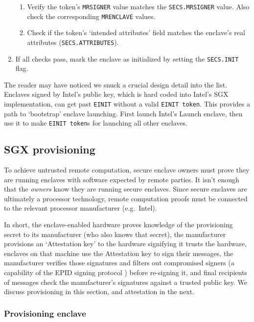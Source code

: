 \begin{enumerate}
\begin{enumerate}
        \item Verify the token's {\tt MRSIGNER} value matches the {\tt SECS.MRSIGNER} value. Also check the corresponding {\tt MRENCLAVE} values.

        \item Check if the token's `intended attributes' field matches the enclave's real attributes ({\tt SECS.ATTRIBUTES}).
    \end{enumerate}

    \item If all checks pass, mark the enclave as initialized by setting the {\tt SECS.INIT} flag.
\end{enumerate}

The reader may have noticed we snuck a crucial design detail into the list. Enclaves signed by Intel's public key, which is hard coded into Intel's SGX implementation, can get past {\tt EINIT} without a valid {\tt EINIT token}. This provides a path to `bootstrap' enclave launching. First launch Intel's Launch enclave, then use it to make {\tt EINIT token}s for launching all other enclaves.


\subsection{SGX provisioning}
\label{subsec:enclaves-sgx-provisioning}

To achieve untrusted remote computation, secure enclave owners must prove they are running enclaves with software expected by remote parties. It isn't enough that the {\em owners} know they are running secure enclaves. Since secure enclaves are ultimately a processor technology, remote computation proofs must be connected to the relevant processor manufacturer (e.g.\ Intel).

In short, the enclave-enabled hardware proves knowledge of the provisioning secret to its manufacturer (who also knows that secret), the manufacturer provisions an `Attestation key' to the hardware signifying it trusts the hardware, enclaves on that machine use the Attestation key to sign their messages, the manufacturer verifies those signatures and filters out compromised signers (a capability of the EPID signing protocol \cite{epid-paper}) before re-signing it, and final recipients of messages check the manufacturer's signatures against a trusted public key. We discuss provisioning in this section, and attestation in the next.

\subsubsection{Provisioning enclave}

